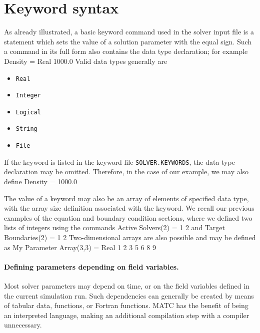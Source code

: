 


\section{Keyword syntax}
As already illustrated,
a basic keyword command used in the solver input file
is a statement which sets the value of a solution parameter with the equal sign.
Such a command in its full form also contains the data type declaration; for example
\ttbegin
Density = Real 1000.0
\ttend
Valid data types generally are
\begin{itemize}
\item {\tt Real}
\item {\tt Integer}
\item {\tt Logical}
\item {\tt String}
\item {\tt File}
\end{itemize}
If the keyword is listed in the keyword file {\tt SOLVER.KEYWORDS}, the data type declaration
may be omitted. Therefore, in the case of our example, we may also define
\ttbegin
Density = 1000.0
\ttend

The value of a keyword may also be an array of elements of specified data type, 
with the array size definition associated with the keyword. We recall our previous examples
of the equation and boundary condition sections, where we defined two lists of integers
using the commands
\ttbegin
Active Solvers(2) = 1 2
\ttend
and
\ttbegin
Target Boundaries(2) = 1 2
\ttend
Two-dimensional arrays are also possible and may be defined as
\ttbegin
My Parameter Array(3,3) = Real 1 2 3  5 6  8 9 

\ttend

%


\paragraph{Defining parameters depending on field variables.}
Most solver parameters may depend on time, or on the field variables defined in the current simulation run. 
Such dependencies can generally be created by means of
tabular data,    functions, or Fortran  functions. MATC has the benefit of being an interpreted 
language, making an additional compilation step with a compiler unnecessary.

